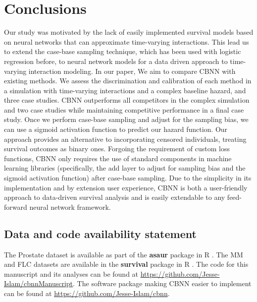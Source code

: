 \documentclass[APA,LATO1COL]{WileyNJD-v2}
\begin{document}
\section{Conclusions}\label{sec5}

Our study was motivated by the lack of easily implemented survival models based on neural networks that can approximate time-varying interactions.
This lead us to extend the case-base sampling technique, which has been used with logistic regression before, to neural network models for a data driven
approach to time-varying interaction modeling. In our paper, We aim to compare CBNN with existing methods. We assess the discrimination and calibration
of each method in a simulation with time-varying interactions and a complex baseline hazard, and three case studies. CBNN outperforms all competitors in
the complex simulation and two case studies while maintaining competitive performance in a final case study. Once we perform case-base sampling and
adjust for the sampling bias, we can use a sigmoid activation function to predict our hazard function. Our approach provides an alternative to incorporating
censored individuals, treating survival outcomes as binary ones. Forgoing the requirement of custom loss functions, CBNN only requires the use of standard
components in machine learning libraries (specifically, the add layer to adjust for sampling bias and the sigmoid activation function) after case-base sampling.
Due to the simplicity in its implementation and by extension user experience, CBNN is both a user-friendly approach to data-driven survival analysis and is
easily extendable to any feed-forward neural network framework.


\hypertarget{data-and-code-availability-statement}{%
\subsection*{Data and code availability
statement}\label{data-and-code-availability-statement}}


The Prostate dataset is available as part of the \textbf{asaur} package in R \citep{asaur}.
The MM and FLC datasets are available in the \textbf{survival} package in R \citep{survpkg}.
The code for this manuscript and its analyses can be found at
\url{https://github.com/Jesse-Islam/cbnnManuscript}. The software
package making CBNN easier to implement can be found at
\url{https://github.com/Jesse-Islam/cbnn}.
\end{document}

